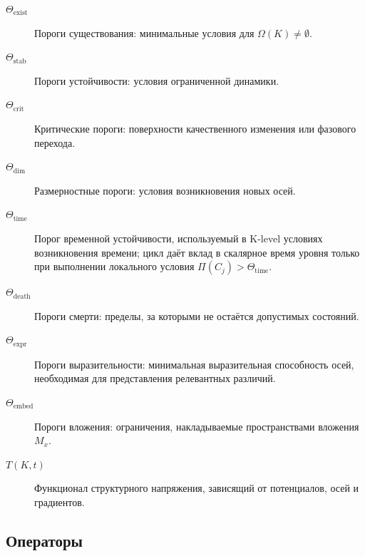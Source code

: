 \begin{description}
  \item[\(\Theta_{\mathrm{exist}}\)] Пороги существования:
        минимальные условия для \(\Omega(K)\neq\emptyset\).
  \item[\(\Theta_{\mathrm{stab}}\)] Пороги устойчивости:
        условия ограниченной динамики.
  \item[\(\Theta_{\mathrm{crit}}\)] Критические пороги:
        поверхности качественного изменения или фазового перехода.
  \item[\(\Theta_{\mathrm{dim}}\)] Размерностные пороги:
        условия возникновения новых осей.
  \item[\(\Theta_{\mathrm{time}}\)] Порог временной устойчивости, используемый
        в K-level условиях возникновения времени; цикл даёт вклад в скалярное
        время уровня только при выполнении локального условия
        \(\Pi(C_j)>\Theta_{\mathrm{time}}\).
  \item[\(\Theta_{\mathrm{death}}\)] Пороги смерти:
        пределы, за которыми не остаётся допустимых состояний.
  \item[\(\Theta_{\mathrm{expr}}\)] Пороги выразительности:
        минимальная выразительная способность осей, необходимая для
        представления релевантных различий.
  \item[\(\Theta_{\mathrm{embed}}\)] Пороги вложения:
        ограничения, накладываемые пространствами вложения \(M_x\).
  \item[\(T(K,t)\)] Функционал структурного напряжения, зависящий от
        потенциалов, осей и градиентов.
\end{description}

\subsection{Операторы}

